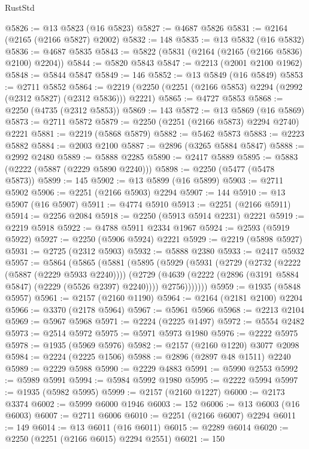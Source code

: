\begin{lexlean}{RustStd}
\begin{coremodule}
{\begin{coremodule}
{{{{{{{{{{{{{{{{{{{{{{{{{{{{{{{{{{{{{{{{{{{{{{{{{{{{{@5826 := @13 @5823 (@16 @5823)
@5827 := @4687 @5826
@5831 := @2164 (@2165 (@2166 @5827) @2002)
@5832 := 148
@5835 := @13 @5832 (@16 @5832)
@5836 := @4687 @5835
@5843 := @5822 (@5831 (@2164 (@2165 (@2166 @5836) @2100) @2204))
@5844 := @5820 @5843
@5847 := @2213 (@2001 @2100 @1962)
@5848 := @5844 @5847
@5849 := 146
@5852 := @13 @5849 (@16 @5849)
@5853 := @2711 @5852
@5864 := @2219 (@2250 (@2251 (@2166 @5853) @2294 (@2992 (@2312 @5827) (@2312 @5836))) @2221)
@5865 := @4727 @5853
@5868 := @2250 (@4735 (@2312 @5853))
@5869 := 143
@5872 := @13 @5869 (@16 @5869)
@5873 := @2711 @5872
@5879 := @2250 (@2251 (@2166 @5873) @2294 @2740) @2221
@5881 := @2219 (@5868 @5879)
@5882 := @5462 @5873
@5883 := @2223 @5882
@5884 := @2003 @2100
@5887 := @2896 (@3265 @5884 @5847)
@5888 := @2992 @2480
@5889 := @5888 @2285
@5890 := @2417 @5889
@5895 := @5883 (@2222 (@5887 (@2229 @5890 @2240)))
@5898 := @2250 (@5477 (@5478 @5873))
@5899 := 145
@5902 := @13 @5899 (@16 @5899)
@5903 := @2711 @5902
@5906 := @2251 (@2166 @5903) @2294
@5907 := 144
@5910 := @13 @5907 (@16 @5907)
@5911 := @4774 @5910
@5913 := @2251 (@2166 @5911)
@5914 := @2256 @2084
@5918 := @2250 (@5913 @5914 @2231) @2221
@5919 := @2219 @5918
@5922 := @4788 @5911 @2334 @1967
@5924 := @2593 (@5919 @5922)
@5927 := @2250 (@5906 @5924) @2221
@5929 := @2219 (@5898 @5927)
@5931 := @2725 (@2312 @5903)
@5932 := @5888 @2380
@5933 := @2417 @5932
@5957 := @5864
    (@5865
      (@5881
        (@5895
          (@5929
            (@5931
              (@2729
                (@2732 (@2222 (@5887 (@2229 @5933 @2240))))
                (@2729
                  (@4639 (@2222 (@2896 (@3191 @5884 @5847) (@2229 (@5526 @2397) @2240))))
                  @2756)))))))
@5959 := @1935 (@5848 @5957)
@5961 := @2157 (@2160 @1190)
@5964 := @2164 (@2181 @2100) @2204
@5966 := @3370 (@2178 @5964)
@5967 := @5961 @5966
@5968 := @2213 @2104
@5969 := @5967 @5968
@5971 := @2224 (@2225 @1497)
@5972 := @5554 @2482
@5973 := @2514 @5972
@5975 := @5971 @5973 @1980
@5976 := @2222 @5975
@5978 := @1935 (@5969 @5976)
@5982 := @2157 (@2160 @1220) @3077 @2098
@5984 := @2224 (@2225 @1506)
@5988 := @2896 (@2897 @48 @1511) @2240
@5989 := @2229 @5988
@5990 := @2229 @4883
@5991 := @5990 @2553
@5992 := @5989 @5991
@5994 := @5984 @5992 @1980
@5995 := @2222 @5994
@5997 := @1935 (@5982 @5995)
@5999 := @2157 (@2160 @1227)
@6000 := @2173 @3374
@6002 := @5999 @6000 @1946
@6003 := 152
@6006 := @13 @6003 (@16 @6003)
@6007 := @2711 @6006
@6010 := @2251 (@2166 @6007) @2294
@6011 := 149
@6014 := @13 @6011 (@16 @6011)
@6015 := @2289 @6014
@6020 := @2250 (@2251 (@2166 @6015) @2294 @2551)
@6021 := 150
}}}}}}}}}}}}}}}}}}}}}}}}}}}}}}}}}}}}}}}}}}}}}}}}}}}}}
\end{coremodule}}
\end{coremodule}
\end{lexlean}
